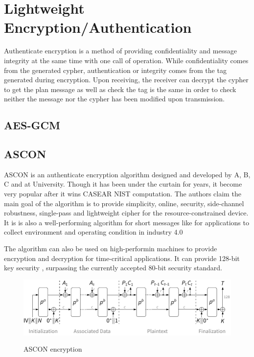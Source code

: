 \section{Lightweight Encryption/Authentication }


Authenticate encryption is a method of providing confidentiality and message integrity at the same time with one call of operation. While confidentiality comes from the generated cypher, authentication or integrity comes from the tag generated during encryption. Upon receiving, the receiver can decrypt the cypher to get the plan message as well as check the tag is the same in order to check neither the message nor the cypher has been modified upon transmission.

\subsection{AES-GCM}


\subsection{ASCON}

ASCON is an authenticate encryption algorithm designed and developed by A, B, C and at University. Though it has been under the curtain for years, it become very popular after it wins CASEAR NIST computation. The authors claim the main goal of the algorithm is to provide simplicity, online, security, side-channel robustness, single-pass and lightweight cipher for the resource-constrained device. It is is also a well-performing algorithm for short messages \cite{dobraunigAsconV1Lightweight2021} like for applications to collect environment and operating condition in industry 4.0

The algorithm can also be used on high-performin machines to provide encryption and decryption for  time-critical applications. It can provide 128-bit key security \cite{dobraunigAsconV1Lightweight2021}, surpassing the currently accepted 80-bit security standard.


\begin{figure}[H]
    \centering
    \caption{ASCON encryption }
    \includegraphics{images/fp/aead_encrypt.pdf}
    \label{fig:ascon-enc}
\end{figure}

